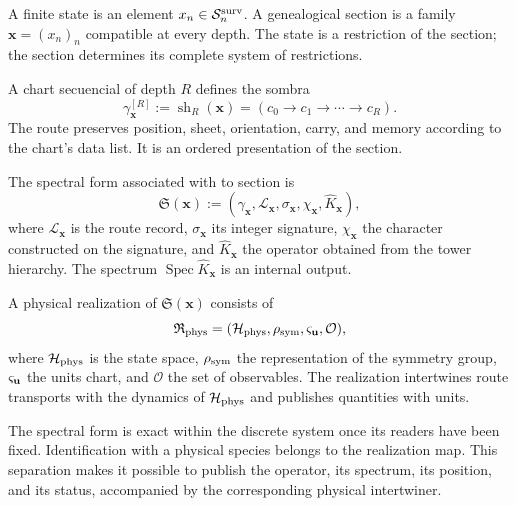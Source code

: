 \begin{definition}
\label{def:estado-finito-seccion-genealogica-md}
A finite state is an element \(x_n\in\mathcal S_n^{\rm surv}\). A genealogical section is a
family \(\boldsymbol x=(x_n)_n\) compatible at every depth. The state is a restriction
of the section; the section determines its complete system of restrictions.
\end{definition}

\begin{definition}
\label{def:ruta-observable-bisagra-md}
A chart secuencial of depth \(R\) defines the sombra
\[
 \gamma_{\boldsymbol x}^{[R]}
 :=\operatorname{sh}_R(\boldsymbol x)
 =(c_0\to c_1\to\cdots\to c_R).
\]
The route preserves position, sheet, orientation, carry, and memory according to the
chart's data list. It is an ordered presentation of the section.
\end{definition}

\begin{definition}
\label{def:forma-espectral-numero-md}
The spectral form associated with to section is
\[
 \mathfrak S(\boldsymbol x)
 :=(\gamma_{\boldsymbol x},
    \mathcal L_{\boldsymbol x},
    \sigma_{\boldsymbol x},
    \chi_{\boldsymbol x},
    \widehat K_{\boldsymbol x}),
\]
where \(\mathcal L_{\boldsymbol x}\) is the route record,
\(\sigma_{\boldsymbol x}\) its integer signature, \(\chi_{\boldsymbol x}\) the
character constructed on the signature, and \(\widehat K_{\boldsymbol x}\) the
operator obtained from the tower hierarchy. The spectrum
\(\operatorname{Spec}\widehat K_{\boldsymbol x}\) is an internal output.
\end{definition}

\begin{definition}
\label{def:realizacion-fisica-forma-espectral}
A physical realization of \(\mathfrak S(\boldsymbol x)\) consists of
\[
 \mathfrak R_{\rm phys}
 =(\mathcal H_{\rm phys},\rho_{\rm sym},\varsigma_{\bf u},\mathcal O),
\]
where \(\mathcal H_{\rm phys}\) is the state space, \(\rho_{\rm sym}\) the representation of
the symmetry group, \(\varsigma_{\bf u}\) the units chart, and \(\mathcal O\) the set
of observables. The realization intertwines route transports with the
dynamics of \(\mathcal H_{\rm phys}\) and publishes quantities with units.
\end{definition}

The spectral form is exact within the discrete system once its
readers have been fixed. Identification with a physical species belongs to the
realization map. This separation makes it possible to publish the operator, its spectrum, its
position, and its status, accompanied by the corresponding physical intertwiner.

